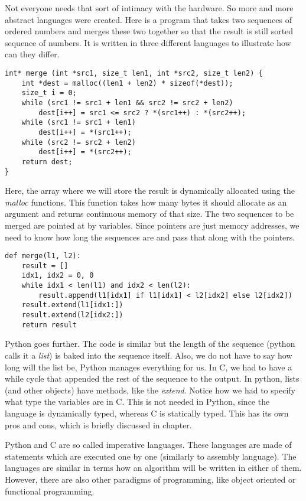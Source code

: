 Not everyone needs that sort of intimacy with the hardware. So more and more abstract languages were created.
Here is a program that takes two sequences of ordered numbers and merges these two together so that the result
is still sorted sequence of numbers. It is written in three different languages to illustrate how can they differ.
\begin{verbatim}
int* merge (int *src1, size_t len1, int *src2, size_t len2) {
    int *dest = malloc((len1 + len2) * sizeof(*dest));
    size_t i = 0;
    while (src1 != src1 + len1 && src2 != src2 + len2)
        dest[i++] = src1 <= src2 ? *(src1++) : *(src2++);
    while (src1 != src1 + len1)
        dest[i++] = *(src1++);
    while (src2 != src2 + len2)
        dest[i++] = *(src2++);
    return dest;
}
\end{verbatim}
Here, the array where we will store the result is dynamically allocated using
the \textit{malloc} functions. This function takes how many bytes it should
allocate as an argument and returns continuous memory of that size. The two
sequences to be merged are pointed at by variables. Since pointers are just
memory addresses, we need to know how long the sequences are and pass that
along with the pointers.

\begin{verbatim}
def merge(l1, l2):
    result = []
    idx1, idx2 = 0, 0
    while idx1 < len(l1) and idx2 < len(l2):
        result.append(l1[idx1] if l1[idx1] < l2[idx2] else l2[idx2])
    result.extend(l1[idx1:])
    result.extend(l2[idx2:])
    return result
\end{verbatim}

Python goes further. The code is similar but the length of the sequence (python calls it a \textit{list})
is baked into the sequence itself. Also, we do not have to say how long will the list be,
Python manages everything for us. In C, we had to have a while cycle that appended
the rest of the sequence to the output. In python, lists (and other objects) have methods,
like the \textit{extend}. Notice how we had to specify what type the variables are in C.
This is not needed in Python, since the language is dynamically typed, whereas 
C is statically typed. This has its own pros and cons, which is briefly discussed in  chapter.

Python and C are so called imperative languages. These languages are 
made of statements which are executed one by one (similarly to assembly language).
The languages are similar in terms how an algorithm will be written in either of them.
However, there are also other paradigms of programming, like object oriented or functional programming.

